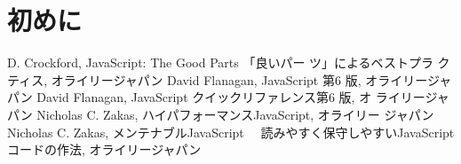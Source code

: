 
\Texttrue

\frontmatter
\maketitle
\chapter*{初めに}

\tableofcontents
\mainmatter

















\backmatter
\begin{thebibliography}{9}
 D. Crockford, JavaScript: The Good Parts 「良いパー
	 ツ」によるベストプラ クティス, オライリージャパン
 David Flanagan, JavaScript 第6 版, オライリージャパン
 David Flanagan, JavaScript クイックリファレンス第6 版, オ
	 ライリージャパン
 Nicholas C. Zakas, ハイパフォーマンスJavaScript, オライリー
	 ジャパン
 Nicholas C. Zakas, メンテナブルJavaScript 　読みやすく保守しやすいJavaScript 
コードの作法, オライリージャパン
\end{thebibliography}

